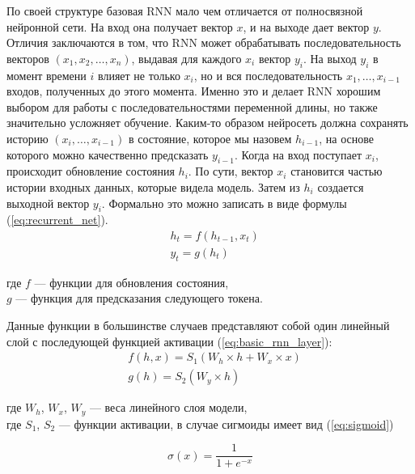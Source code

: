 По своей структуре базовая RNN мало чем отличается от полносвязной нейронной сети. На вход она получает вектор $x$, и на выходе дает вектор $y$. Отличия заключаются в том, что RNN может обрабатывать последовательность векторов $(x_1, x_2, \dots, x_n)$, выдавая для каждого $x_i$ вектор $y_i$. На выход $y_i$ в момент времени $i$ влияет не только $x_i$, но и вся последовательность $x_1, \dots, x_{i-1}$ входов, полученных до этого момента. Именно это и делает RNN хорошим выбором для работы с последовательностями переменной длины, но также значительно усложняет обучение. Каким-то образом нейросеть должна сохранять историю $(x_i, \dots, x_{i-1})$ в состояние, которое мы назовем $h_{i-1}$, на основе которого можно качественно предсказать $y_{i-1}$. Когда на вход поступает $x_i$, происходит обновление состояния $h_i$. По сути, вектор $x_i$ становится частью истории входных данных, которые видела модель. Затем из $h_i$ создается выходной вектор $y_i$. Формально это можно записать в виде формулы (\ref{eq:recurrent_net}).
\begin{equation}
	\begin{split}
		&h_t = f(h_{t-1}, x_t) \\
		&y_t = g(h_t)
	\end{split}
	\label{eq:recurrent_net}
\end{equation}
\begin{explanation}
	где $f$ --- функции для обновления состояния, \\
	$g$ --- функция для предсказания следующего токена.
\end{explanation}

Данные функции в большинстве случаев представляют собой один линейный слой с последующей функцией активации (\ref{eq:basic_rnn_layer}):
\begin{equation}
	\begin{split}
		&f(h, x) = S_1(W_h \times h + W_x \times x) \\
		&g(h) = S_2(W_y \times h)
	\end{split}
	\label{eq:basic_rnn_layer}
\end{equation}
\begin{explanation}
	где $W_h$, $W_x$, $W_y$ --- веса линейного слоя модели, \\
	где $S_1$, $S_2$ --- функции активации, в случае сигмоиды имеет вид (\ref{eq:sigmoid})
\end{explanation}
\begin{equation}
	\sigma(x) = \frac{1}{1 + e^{-x}}
	\label{eq:sigmoid}
\end{equation}

